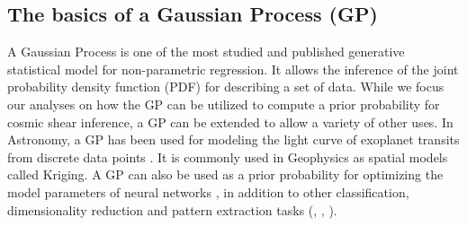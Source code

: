 \subsection{The basics of a Gaussian Process (GP)}
A Gaussian Process is one of the most studied and published 
generative statistical model for non-parametric regression. 
It allows the inference of the joint probability density 
function (PDF) for describing a set of data. 
While we focus our analyses on how the GP can be utilized to compute a prior
probability for cosmic shear inference, a GP can be extended to 
allow a variety of other uses. In Astronomy, a GP has been used for modeling 
the light curve of exoplanet transits from discrete data points
\citep{Ambikasaran2014a}. It is commonly used in Geophysics as spatial models
called Kriging. A GP can also be used as a prior probability for optimizing the 
model parameters of neural networks \citep{Snoek2012}, in addition to 
other classification, dimensionality reduction 
and pattern extraction tasks
(\citealt{Wilson2013}, \citealt{Duvenaud2013}, \citealt{Rasmussen2006}).
 
